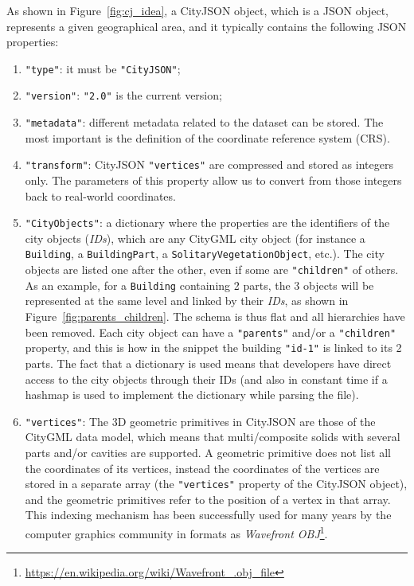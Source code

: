 \documentclass[11pt,halfparskip,parskip=half]{scrartcl}
\begin{document}
As shown in Figure~\ref{fig:cj_idea}, a CityJSON object, which is a JSON object, represents a given geographical area, and it typically contains the following JSON properties:
\begin{enumerate}
  \item \texttt{"type"}: it must be \texttt{"CityJSON"};
  \item \texttt{"version"}: \texttt{"2.0"} is the current version;
  \item \texttt{"metadata"}: different metadata related to the dataset can be stored. The most important is the definition of the coordinate reference system (CRS).
  \item \texttt{"transform"}: CityJSON \texttt{"vertices"} are compressed and stored as integers only. The parameters of this property allow us to convert from those integers back to real-world coordinates.
  \item \texttt{"CityObjects"}: a dictionary where the properties are the identifiers of the city objects (\emph{IDs}), which are any CityGML city object (for instance a \texttt{Building}, a \texttt{BuildingPart}, a \texttt{SolitaryVegetationObject}, etc.).
  The city objects are listed one after the other, even if some are \texttt{"children"} of others.
  As an example, for a \texttt{Building} containing 2 parts, the 3 objects will be represented at the same level and linked by their \emph{IDs}, as shown in Figure~\ref{fig:parents_children}.
  The schema is thus flat and all hierarchies have been removed.
  Each city object can have a \texttt{"parents"} and/or a \texttt{"children"} property, and this is how in the snippet the building \texttt{"id-1"} is linked to its 2 parts.
  The fact that a dictionary is used means that developers have direct access to the city objects through their IDs (and also in constant time if a hashmap is used to implement the dictionary while parsing the file).
  \item \texttt{"vertices"}: The 3D geometric primitives in CityJSON are those of the CityGML data model, which means that multi/composite solids with several parts and/or cavities are supported.
  A geometric primitive does not list all the coordinates of its vertices, instead the coordinates of the vertices are stored in a separate array (the \texttt{"vertices"} property of the CityJSON object), and the geometric primitives refer to the position of a vertex in that array.
  This indexing mechanism has been successfully used for many years by the computer graphics community in formats as \emph{Wavefront OBJ}\footnote{\url{https://en.wikipedia.org/wiki/Wavefront_.obj_file}}.

\end{enumerate}
\end{document}
